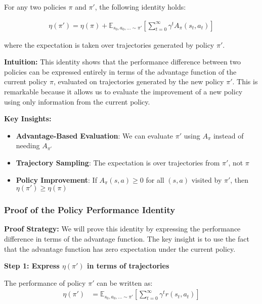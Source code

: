 \begin{theorem}
For any two policies $\pi$ and $\pi'$, the following identity holds:

\begin{align}\label{eq_3}
    \eta(\pi')=\eta(\pi)+\mathbb{E}_{s_{0}, a_{0}, \ldots \sim \pi'} \left[\sum_{t = 0}^{\infty} \gamma^t A_\pi(s_t, a_t)\right]
\end{align}

where the expectation is taken over trajectories generated by policy $\pi'$.
\end{theorem}

\textbf{Intuition:}
This identity shows that the performance difference between two policies can be expressed entirely in terms of the advantage function of the current policy $\pi$, evaluated on trajectories generated by the new policy $\pi'$. This is remarkable because it allows us to evaluate the improvement of a new policy using only information from the current policy.

\textbf{Key Insights:}
\begin{itemize}
    \item \textbf{Advantage-Based Evaluation}: We can evaluate $\pi'$ using $A_\pi$ instead of needing $A_{\pi'}$
    \item \textbf{Trajectory Sampling}: The expectation is over trajectories from $\pi'$, not $\pi$
    \item \textbf{Policy Improvement}: If $A_\pi(s,a) \geq 0$ for all $(s,a)$ visited by $\pi'$, then $\eta(\pi') \geq \eta(\pi)$
\end{itemize}

\subsubsection{Proof of the Policy Performance Identity}

\textbf{Proof Strategy:}
We will prove this identity by expressing the performance difference in terms of the advantage function. The key insight is to use the fact that the advantage function has zero expectation under the current policy.

\textbf{Step 1: Express $\eta(\pi')$ in terms of trajectories}

The performance of policy $\pi'$ can be written as:
\begin{align}
\eta(\pi') &= \mathbb{E}_{s_0, a_0, \ldots \sim \pi'} \left[ \sum_{t = 0}^{\infty} \gamma^t r(s_t, a_t) \right]
\end{align}

